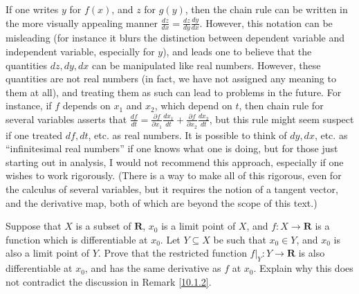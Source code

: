 \setcounter{theorem}{16}
\begin{remark}\label{10.1.17}
    If one writes \(y\) for \(f(x)\), and \(z\) for \(g(y)\), then the chain rule can be written in the more visually appealing manner \(\frac{dz}{dx} = \frac{dz}{dy} \frac{dy}{dx}\).
    However, this notation can be misleading (for instance it blurs the distinction between dependent variable and independent variable, especially for \(y\)), and leads one to believe that the quantities \(dz, dy, dx\) can be manipulated like real numbers.
    However, these quantities are not real numbers (in fact, we have not assigned any meaning to them at all), and treating them as such can lead to problems in the future.
    For instance, if \(f\) depends on \(x_1\) and \(x_2\), which depend on \(t\), then chain rule for several variables asserts that \(\frac{df}{dt} = \frac{\partial f}{\partial x_1} \frac{dx_1}{dt} + \frac{\partial f}{\partial x_2} \frac{dx_2}{dt}\), but this rule might seem suspect if one treated \(df, dt\), etc. as real numbers.
    It is possible to think of \(dy, dx\), etc. as ``infinitesimal real numbers'' if one knows what one is doing, but for those just starting out in analysis, I would not recommend this approach, especially if one wishes to work rigorously.
    (There is a way to make all of this rigorous, even for the calculus of several variables, but it requires the notion of a tangent vector, and the derivative map, both of which are beyond the scope of this text.)
\end{remark}

\exercisesection

\begin{exercise}\label{ex 10.1.1}
    Suppose that \(X\) is a subset of \(\mathbf{R}\), \(x_0\) is a limit point of \(X\), and \(f : X \to \mathbf{R}\) is a function which is differentiable at \(x_0\).
    Let \(Y \subseteq X\) be such that \(x_0 \in Y\), and \(x_0\) is also a limit point of \(Y\).
    Prove that the restricted function \(f|_Y : Y \to \mathbf{R}\) is also differentiable at \(x_0\), and has the same derivative as \(f\) at \(x_0\).
    Explain why this does not contradict the discussion in Remark \ref{10.1.2}.
\end{exercise}

